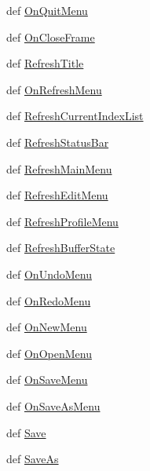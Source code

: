 \begin{CompactItemize}
\item 
def \hyperlink{classobjdictedit_1_1objdictedit_bb517a0b8fd0e43f1a1d68c7ce372ac3}{On\-Quit\-Menu}
\item 
def \hyperlink{classobjdictedit_1_1objdictedit_ef6f7560bf9be52aa312833771cfb3c9}{On\-Close\-Frame}
\item 
def \hyperlink{classobjdictedit_1_1objdictedit_ae8f91209a1bc14a0b7b7b62475d7f59}{Refresh\-Title}
\item 
def \hyperlink{classobjdictedit_1_1objdictedit_88ca3cd196a27f86a3253599b588ee4c}{On\-Refresh\-Menu}
\item 
def \hyperlink{classobjdictedit_1_1objdictedit_555d5c79e43419d21eca542c42de567d}{Refresh\-Current\-Index\-List}
\item 
def \hyperlink{classobjdictedit_1_1objdictedit_91f233bc35906db726537b4dc4a51d28}{Refresh\-Status\-Bar}
\item 
def \hyperlink{classobjdictedit_1_1objdictedit_adc9eb58dc3ff58afd5ff7451a62923d}{Refresh\-Main\-Menu}
\item 
def \hyperlink{classobjdictedit_1_1objdictedit_2b33b17be4ab0796b701fc916fcf7e64}{Refresh\-Edit\-Menu}
\item 
def \hyperlink{classobjdictedit_1_1objdictedit_d9fcd386d41eff2b5f7475c7c4e2e501}{Refresh\-Profile\-Menu}
\item 
def \hyperlink{classobjdictedit_1_1objdictedit_be28bc389ae846a97daba676fbe064db}{Refresh\-Buffer\-State}
\item 
def \hyperlink{classobjdictedit_1_1objdictedit_264a8c0092529d669e103a0e08bfa759}{On\-Undo\-Menu}
\item 
def \hyperlink{classobjdictedit_1_1objdictedit_e864e63ae5efdb88512d02c0e51d895e}{On\-Redo\-Menu}
\item 
def \hyperlink{classobjdictedit_1_1objdictedit_40237739c2edecc9ba933051404a5c61}{On\-New\-Menu}
\item 
def \hyperlink{classobjdictedit_1_1objdictedit_98335ef3e9581fd3915a23d40b7f66c0}{On\-Open\-Menu}
\item 
def \hyperlink{classobjdictedit_1_1objdictedit_4ec2a606f003b9428515bc47a63f549b}{On\-Save\-Menu}
\item 
def \hyperlink{classobjdictedit_1_1objdictedit_4120aa522383dd8fe88df46672e1464c}{On\-Save\-As\-Menu}
\item 
def \hyperlink{classobjdictedit_1_1objdictedit_017884a8631f8a0bdfe3d37a941c196c}{Save}
\item 
def \hyperlink{classobjdictedit_1_1objdictedit_67eeca8c238cfd33c1d8e8fb33f07a5c}{Save\-As}

\end{CompactItemize}
